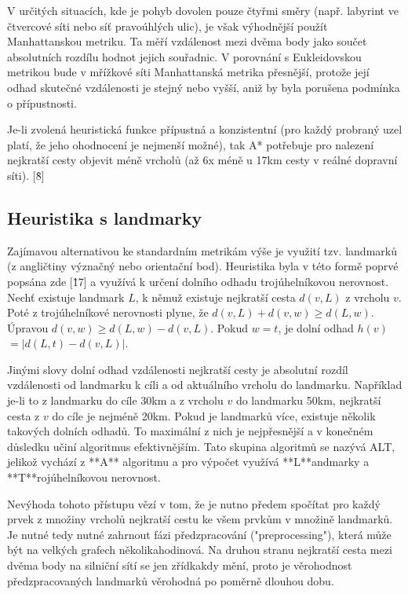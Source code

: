 V určitých situacích, kde je pohyb dovolen pouze čtyřmi směry (např. labyrint ve čtvercové síti nebo síť pravoúhlých ulic), je však výhodnější použít Manhattanskou metriku. Ta měří vzdálenost mezi dvěma body jako součet absolutních rozdílu hodnot jejich souřadnic. V porovnání s Eukleidovskou metrikou bude v mřížkové síti Manhattanská metrika přesnější, protože její odhad skutečné vzdálenosti je stejný nebo vyšší, aniž by byla porušena podmínka o přípustnosti. 

Je-li zvolená heuristická funkce přípustná a konzistentní (pro každý probraný uzel platí, že jeho ohodnocení je nejmenší možné), tak A* potřebuje pro nalezení nejkratší cesty objevit méně vrcholů (až 6x méně u 17km cesty v reálné dopravní síti). [\^8]


\subsection{ Heuristika s landmarky}
Zajímavou alternativou ke standardním metrikám výše je využití tzv. landmarků (z angličtiny význačný nebo orientační bod).  Heuristika byla v této formě poprvé popsána zde [\^17] a využívá k určení dolního odhadu trojúhelníkovou nerovnost. Nechť existuje landmark $L$, k němuž existuje nejkratší cesta $d(v,L)$ z vrcholu $v$. Poté z trojúhelníkové nerovnosti plyne, že $d(v,L) +d(v,w) \geq d(L, w)$. Úpravou $d(v,w) \geq d(L, w) - d(v, L)$. Pokud $w = t$, je  dolní odhad $h(v)$  $= |d(L, t) - d(v, L)|$. 

Jinými slovy dolní odhad vzdálenosti nejkratší cesty je absolutní rozdíl vzdálenosti od landmarku k cíli a od aktuálního vrcholu do landmarku. Například je-li to z landmarku do cíle 30km a z vrcholu $v$ do landmarku 50km, nejkratší cesta z $v$ do cíle je nejméně 20km. Pokud je landmarků více, existuje několik takových dolních odhadů. To maximální z nich je nejpřesnější a v konečném důsledku učiní algoritmus efektivnějším. Tato skupina algoritmů se nazývá ALT, jelikož vychází z **A**\* algoritmu a pro výpočet využívá **L**andmarky a **T**rojúhelníkovou nerovnost.

Nevýhoda tohoto přístupu vězí v tom, že je nutno předem spočítat pro každý prvek z množiny vrcholů nejkratší cestu ke všem prvkům v množině landmarků. Je nutné tedy nutné zahrnout fázi předzpracování ("preprocessing"), která může být na velkých grafech několikahodinová. Na druhou stranu nejkratší cesta mezi dvěma body na silniční sítí se jen zřídkakdy mění, proto je věrohodnost předzpracovaných landmarků věrohodná po poměrně dlouhou dobu.

